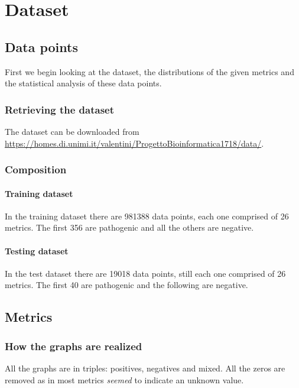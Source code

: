 \providecommand{\main}{.}

\usepackage{booktabs}




{\hypersetup{hidelinks}
	\tableofcontents  %
}
\part{Dataset}
\chapter{Data points}
First we begin looking at the dataset, the distributions of the given metrics and the statistical analysis of these data points.

\section{Retrieving the dataset}
The dataset can be downloaded from \url{https://homes.di.unimi.it/valentini/ProgettoBioinformatica1718/data/}.

\section{Composition}
\subsection{Training dataset}
In the training dataset there are 981388 data points, each one comprised of 26 metrics. The first 356 are pathogenic and all the others are negative.

\subsection{Testing dataset}
In the test dataset there are 19018 data points, still each one comprised of 26 metrics. The first 40 are pathogenic and the following are negative.

\chapter{Metrics}
\section{How the graphs are realized}
All the graphs are in triples: positives, negatives and mixed. All the zeros are removed as in most metrics \textit{seemed} to indicate an unknown value.

